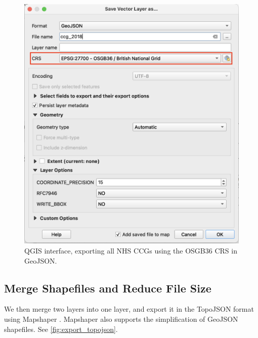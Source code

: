 {    \begin{figure}[tbh!]
        \centering
        \includegraphics[width=\columnwidth]{figure/qgis/export_ccgs.png}
        \caption{QGIS interface, exporting all NHS CCGs using the OSGB36 CRS in GeoJSON.}
        \label{fig:export_ccgs}
    \end{figure}

}

\subsection{Merge Shapefiles and Reduce File Size}

We then merge two layers into one layer, and export it in the TopoJSON format using Mapshaper \cite{blochMapshaper}. Mapshaper also supports the simplification of GeoJSON shapefiles. See \autoref{fig:export_topojson}.

